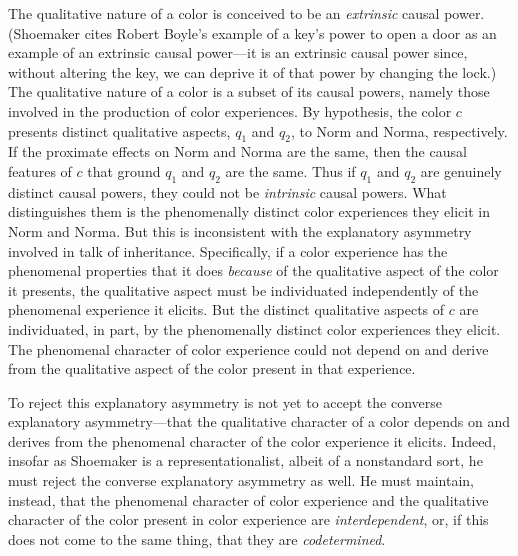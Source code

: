\documentclass[12pt]{article}
\begin{document}
The qualitative nature of a color is conceived to be an \emph{extrinsic} causal power. (Shoemaker cites Robert Boyle's example of a key's power to open a door as an example of an extrinsic causal power---it is an extrinsic causal power since, without altering the key, we can deprive it of that power by changing the lock.) The qualitative nature of a color is a subset of its causal powers, namely those involved in the production of color experiences. By hypothesis, the color $c$ presents distinct qualitative aspects, $q_1$ and $q_2$, to Norm and Norma, respectively. If the proximate effects on Norm and Norma are the same, then the causal features of $c$ that ground $q_1$ and $q_2$ are the same. Thus if $q_1$ and $q_2$ are genuinely distinct causal powers, they could not be \emph{intrinsic} causal powers. What distinguishes them is the phenomenally distinct color experiences they elicit in Norm and Norma. But this is inconsistent with the explanatory asymmetry involved in talk of inheritance. Specifically, if a color experience has the phenomenal properties that it does \emph{because} of the qualitative aspect of the color it presents, the qualitative aspect must be individuated independently of the phenomenal experience it elicits. But the distinct qualitative aspects of $c$ are individuated, in part, by the phenomenally distinct color experiences they elicit. The phenomenal character of color experience could not depend on and derive from the qualitative aspect of the color present in that experience.

To reject this explanatory asymmetry is not yet to accept the converse explanatory asymmetry---that the qualitative character of a color depends on and derives from the phenomenal character of the color experience it elicits. Indeed, insofar as Shoemaker is a representationalist, albeit of a nonstandard sort, he must reject the converse explanatory asymmetry as well. He must maintain, instead, that the phenomenal character of color experience and the qualitative character of the color present in color experience are \emph{interdependent}, or, if this does not come to the same thing, that they are \emph{codetermined}.
\end{document}
